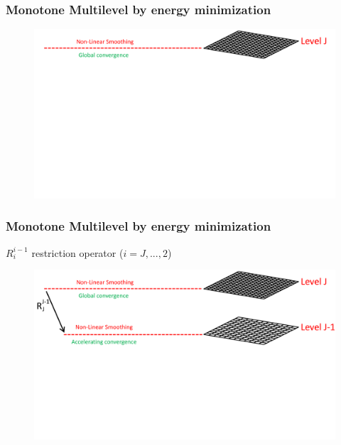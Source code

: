 \documentclass[8pt, oneside]{beamer}   	%
\newcommand{\titlecolor}[1]{\frametitle{\textcolor{dkgrey}{ \textbf{#1}}}}
\begin{document}
\begin{frame}
\titlecolor{Monotone Multilevel by energy minimization}
\begin{figure}[htbp!]
		\centering
	\includegraphics[width=1\textwidth]{img/multigridexplained1.pdf}
\end{figure}
\end{frame}

\begin{frame}
\titlecolor{Monotone Multilevel by energy minimization}
$R_{i}^{i-1}$ restriction operator ($ i=J,...,2 $)
\begin{figure}[htbp!]
		\centering
	\includegraphics[width=1\textwidth]{img/multigridexplained2.pdf}
\end{figure}
\end{frame}
\end{document}

